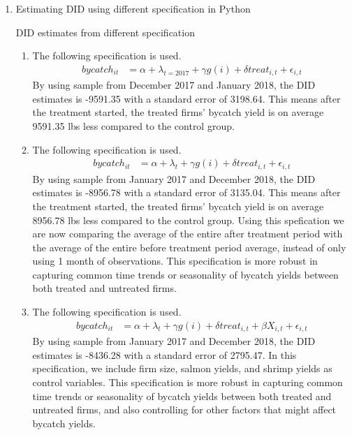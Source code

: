 \documentclass{article}
\begin{document}
\begin{enumerate}
\item Estimating DID using different specification in Python
\begin{table}[H]\centering
    \begin{threeparttable}
    \caption{DID estimates from different specification}
    \label{t2:didstimatesspecification}
    
    \end{threeparttable}
\end{table}
\begin{enumerate}
    \item The following specification is used. 
    \begin{align}
        bycatch_{it} &= \alpha + \lambda_{t=2017}+ \gamma g(i) + \delta treat_{i,t} + \epsilon_{i,t} \label{e:spec1a}
    \end{align}
    By using sample from December 2017 and January 2018, the DID estimates is -9591.35 with a standard error of 3198.64. This means after the treatment started, the treated firms' bycatch yield is on average 9591.35 lbs less compared to the control group.
    \item The following specification is used. 
    \begin{align}
        bycatch_{it} &= \alpha + \lambda_{t}+ \gamma g(i) + \delta treat_{i,t} + \epsilon_{i,t} \label{e:spec1b}
    \end{align}
    By using sample from January 2017 and December 2018, the DID estimates is -8956.78 with a standard error of 3135.04. This means after the treatment started, the treated firms' bycatch yield is on average 8956.78 lbs less compared to the control group. Using this spefication we are now comparing the average of the entire after treatment period with the average of the entire before treatment period average, instead of only using 1 month of observations. This specification is more robust in capturing common time trends or seasonality of bycatch yields between both treated and untreated firms.

    \item The following specification is used. 
    \begin{align}
        bycatch_{it} &= \alpha + \lambda_{t}+ \gamma g(i) + \delta treat_{i,t} + \beta X_{i,t} + \epsilon_{i,t} \label{e:spec1b}
    \end{align}
    By using sample from January 2017 and December 2018, the DID estimates is -8436.28 with a standard error of 2795.47. In this specification, we include firm size, salmon yields, and shrimp yields as control variables. This specification is more robust in capturing common time trends or seasonality of bycatch yields between both treated and untreated firms, and also controlling for other factors that might affect bycatch yields.


\end{enumerate}
\end{enumerate}
\end{document}
